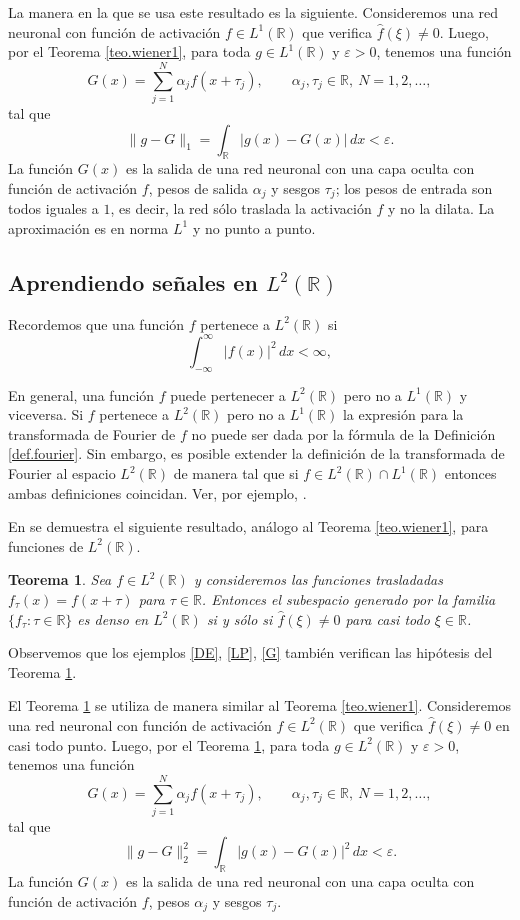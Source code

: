 \documentclass[12pt, a4paper]{amsbook}
\newcommand{\ve}{\varepsilon}
\newcommand{\R}{{\mathbb R}}
\newtheorem{teo}{Teorema}[section]
\theoremstyle{remark}
\theoremstyle{definition}
\numberwithin{section}{chapter}
\numberwithin{subsection}{section}
\numberwithin{equation}{section}
\numberwithin{figure}{chapter}
\begin{document}
La manera en la que se usa este resultado es la siguiente. Consideremos una red neuronal con función de activación $f\in L^1(\R)$ que verifica $\hat f(\xi)\neq 0$. Luego, por el Teorema \ref{teo.wiener1}, para toda $g\in L^1(\R)$ y $\ve>0$, tenemos una función 
$$
G(x) = \sum_{j=1}^N \alpha_j f(x+\tau_j),\qquad \alpha_j, \tau_j\in\R,\ N=1,2,\dots,
$$
tal que 
$$
\|g-G\|_1 = \int_\R |g(x)-G(x)|\, dx <\ve.
$$
La función $G(x)$ es la salida de una red neuronal con una capa oculta con función de activación $f$, pesos de salida $\alpha_j$ y sesgos $\tau_j$; los pesos de entrada son todos iguales a $1$, es decir, la red sólo traslada la activación $f$ y no la dilata. La aproximación es en norma $L^1$ y no punto a punto.

\subsection{Aprendiendo señales en $L^2(\R)$}
Recordemos que una función $f$ pertenece a $L^2(\R)$ si
$$
\int_{-\infty}^\infty |f(x)|^2\, dx < \infty,
$$

En general, una función $f$ puede pertenecer a $L^2(\R)$ pero no a $L^1(\R)$ y viceversa. Si $f$ pertenece a $L^2(\R)$ pero no a $L^1(\R)$ la expresión para la transformada de Fourier de $f$ no puede ser dada por la fórmula de la Definición \ref{def.fourier}. Sin embargo, es posible extender la definición de la transformada de Fourier al espacio $L^2(\R)$ de manera tal que si $f\in L^2(\R)\cap L^1(\R)$ entonces ambas definiciones coincidan. Ver, por ejemplo, \cite{Bonder}.

En \cite{Wiener} se demuestra el siguiente resultado, análogo al Teorema \ref{teo.wiener1}, para funciones de $L^2(\R)$.
\begin{teo}\label{teo.wiener2}
Sea $f\in L^2(\R)$ y consideremos las funciones trasladadas $f_\tau(x)= f(x+\tau)$ para $\tau\in\R$. Entonces el subespacio generado por la familia $\{f_\tau\colon \tau\in\R\}$ es denso en $L^2(\R)$ si y sólo si $\hat f(\xi)\neq 0$ para casi todo $\xi\in\R$.
\end{teo}

Observemos que los ejemplos \ref{DE}, \ref{LP}, \ref{G} también verifican las hipótesis del Teorema \ref{teo.wiener2}.

El Teorema \ref{teo.wiener2} se utiliza de manera similar al Teorema \ref{teo.wiener1}. Consideremos una red neuronal con función de activación $f\in L^2(\R)$ que verifica $\hat f(\xi)\neq 0$ en casi todo punto. Luego, por el Teorema \ref{teo.wiener2}, para toda $g\in L^2(\R)$ y $\ve>0$, tenemos una función 
$$
G(x) = \sum_{j=1}^N \alpha_j f(x+\tau_j),\qquad \alpha_j, \tau_j\in\R,\ N=1,2,\dots,
$$
tal que 
$$
\|g-G\|_2^2 = \int_\R |g(x)-G(x)|^2\, dx <\ve.
$$
La función $G(x)$ es la salida de una red neuronal con una capa oculta con función de activación $f$, pesos $\alpha_j$ y sesgos $\tau_j$.
\end{document}
